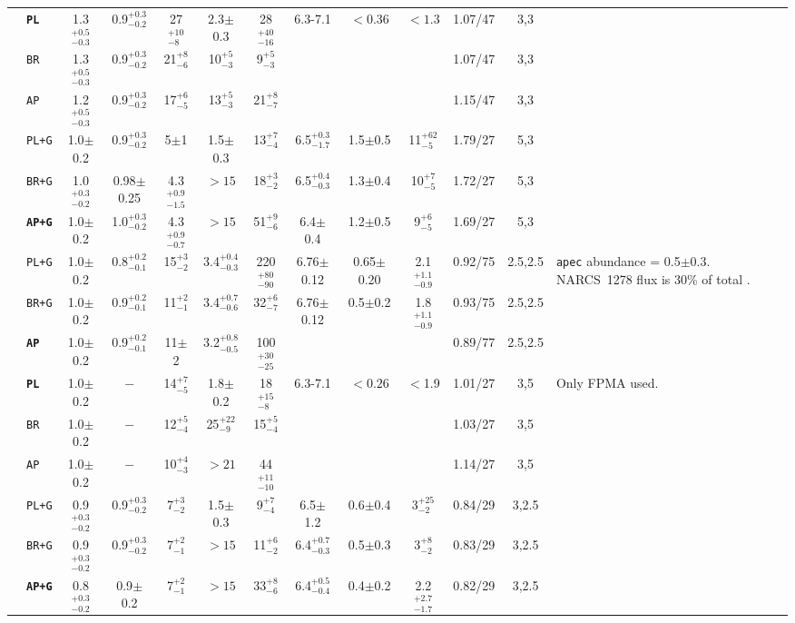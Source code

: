\documentclass[iop,revtex4]{emulateapj}
\newcommand\M{\rule{0pt}{2.3ex}}
\newcommand\U{\rule{0pt}{3.2ex}}       %
\newcommand\D{\rule[-2.4ex]{0pt}{0pt}} %
\begin{document}
\begin{landscape}
\begin{longtable}{cp{0.6in}ccccccccccp{1.7in}}
\U \multirow{3}{*}{5} &\textbf{\texttt{PL}}&1.3$^{+0.5}_{-0.3}$&0.9$^{+0.3}_{-0.2}$&27$^{+10}_{-8}$&2.3$\pm$0.3&28$^{+40}_{-16}$&6.3-7.1 &$<0.36$&$<1.3$&1.07/47&3,3&\\
\M&\texttt{BR}&1.3$^{+0.5}_{-0.3}$&0.9$^{+0.3}_{-0.2}$&21$^{+8}_{-6}$&10$^{+5}_{-3}$&9$^{+5}_{-3}$&&& &1.07/47&3,3&\\
\M\D&\texttt{AP}&1.2$^{+0.5}_{-0.3}$&0.9$^{+0.3}_{-0.2}$&17$^{+6}_{-5}$&13$^{+5}_{-3}$&21$^{+8}_{-7}$&&& &1.15/47&3,3&\\
\cline{13-13}

\U \multirow{3}{*}{6}&\texttt{PL+G}&1.0$\pm$0.2&0.9$^{+0.3}_{-0.2}$&5$\pm$1&1.5$\pm$0.3&13$^{+7}_{-4}$&6.5$^{+0.3}_{-1.7}$ &1.5$\pm$0.5&11$^{+62}_{-5}$&1.79/27&5,3&\\
\M&\texttt{BR+G}&1.0$^{+0.3}_{-0.2}$&0.98$\pm$0.25&4.3$^{+0.9}_{-1.5}$&$>15$&18$^{+3}_{-2}$&6.5$^{+0.4}_{-0.3}$ &1.3$\pm$0.4&10$^{+7}_{-5}$&1.72/27&5,3&\\
\M\D&\textbf{\texttt{AP+G}}&1.0$\pm$0.2&1.0$^{+0.3}_{-0.2}$&4.3$^{+0.9}_{-0.7}$&$>15$&51$^{+9}_{-6}$&6.4$\pm$0.4& 1.2$\pm$0.5&9$^{+6}_{-5}$&1.69/27&5,3&\\
\cline{13-13}

\U \multirow{3}{*}{7}&\texttt{PL+G}&1.0$\pm$0.2&0.8$^{+0.2}_{-0.1}$&15$^{+3}_{-2}$&3.4$^{+0.4}_{-0.3}$&220$^{+80}_{-90}$ &6.76$\pm$0.12&0.65$\pm$0.20&2.1$^{+1.1}_{-0.9}$&0.92/75&2.5,2.5&\multirow{3}{1.7in}{\texttt{apec} abundance = 0.5$\pm$0.3. NARCS~1278 flux is 30\% of total \citep{rahoui14}.}\\
\M&\texttt{BR+G}&1.0$\pm$0.2&0.9$^{+0.2}_{-0.1}$&11$^{+2}_{-1}$&3.4$^{+0.7}_{-0.6}$&32$^{+6}_{-7}$&6.76$\pm$0.12 &0.5$\pm$0.2&1.8$^{+1.1}_{-0.9}$&0.93/75&2.5,2.5&\\
\M\D&\textbf{\texttt{AP}}&1.0$\pm$0.2&0.9$^{+0.2}_{-0.1}$&11$\pm$2&3.2$^{+0.8}_{-0.5}$&100$^{+30}_{-25}$&&& &0.89/77&2.5,2.5&\\
 \cline{13-13}

\U\multirow{3}{*}{8}&\textbf{\texttt{PL}}&1.0$\pm$0.2&$-$&14$^{+7}_{-5}$&1.8$\pm$0.2&18$^{+15}_{-8}$&6.3-7.1&$<0.26$&$<$1.9 &1.01/27&3,5&\multirow{3}{1.7in}{Only FPMA used.}\\ 
\M&\texttt{BR}&1.0$\pm$0.2&$-$&12$^{+5}_{-4}$&25$^{+22}_{-9}$&15$^{+5}_{-4}$&&&&1.03/27&3,5&\\
\M\D&\texttt{AP}&1.0$\pm$0.2&$-$&10$^{+4}_{-3}$&$>21$&44$^{+11}_{-10}$&&&&1.14/27&3,5&\\
\cline{13-13}

\U\multirow{3}{*}{9}&\texttt{PL+G}&0.9$^{+0.3}_{-0.2}$&0.9$^{+0.3}_{-0.2}$&7$^{+3}_{-2}$&1.5$\pm$0.3&9$^{+7}_{-4}$ &6.5$\pm$1.2&0.6$\pm$0.4&3$^{+25}_{-2}$&0.84/29&3,2.5&\\
\M&\texttt{BR+G}&0.9$^{+0.3}_{-0.2}$&0.9$^{+0.3}_{-0.2}$&7$^{+2}_{-1}$&$>15$&11$^{+6}_{-2}$ &6.4$^{+0.7}_{-0.3}$&0.5$\pm$0.3&3$^{+8}_{-2}$&0.83/29&3,2.5&\\
\M\D&\textbf{\texttt{AP+G}}&0.8$^{+0.3}_{-0.2}$&0.9$\pm$0.2&7$^{+2}_{-1}$&$>15$&33$^{+8}_{-6}$&6.4$^{+0.5}_{-0.4}$ &0.4$\pm$0.2&2.2$^{+2.7}_{-1.7}$&0.82/29&3,2.5&\\
\cline{13-13}


\end{longtable}
\end{landscape}
\end{document}
